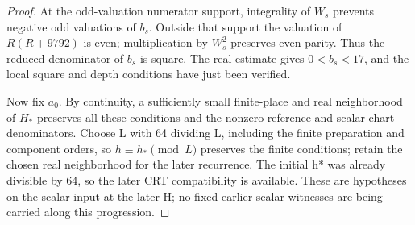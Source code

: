 \begin{proof}
At the odd-valuation numerator support, integrality of $W_s$
prevents negative odd valuations of $b_s$. Outside that support
the valuation of $R(R+9792)$ is even; multiplication by $W_s^2$
preserves even parity. Thus the reduced denominator of $b_s$ is
square. The real estimate gives $0<b_s<17$, and the local square
and depth conditions have just been verified.

Now fix $a_0$. By continuity, a sufficiently small finite-place
and real neighborhood of $H_*$ preserves all these conditions and
the nonzero reference and scalar-chart denominators. Choose L
with 64 dividing L, including the finite preparation and component
orders, so $h\equiv h_*\pmod L$ preserves the finite conditions;
retain the chosen real neighborhood for the later recurrence.
The initial h* was already divisible by 64, so the later CRT
compatibility is available. These are hypotheses on the scalar
input at the later H; no fixed earlier scalar witnesses are being
carried along this progression.
\end{proof}

